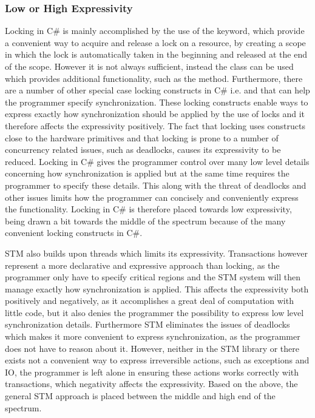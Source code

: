 \subsubsection{Low or High Expressivity}\label{subsec:expressivity}
Locking in C\# is mainly accomplished by the use of the  keyword, which provide a convenient way to acquire and release a lock on a resource, by creating a scope in which the lock is automatically taken in the beginning and released at the end of the scope. However it is not always sufficient, instead the  class can be used which provides additional functionality, such as the  method. Furthermore, there are a number of other special case locking constructs in C\#\cite{microsoftSyncPrim} i.e.    and  that can help the programmer specify synchronization. These locking constructs enable ways to express exactly how synchronization should be applied by the use of locks and it therefore affects the expressivity positively. The fact that locking uses constructs close to the hardware primitives and that  locking is prone to a number of concurrency related issues, such as deadlocks, causes its expressivity to be reduced. Locking in C\# gives the programmer control over many low level details concerning how synchronization is applied but at the same time requires the programmer to specify these details. This along with the threat of deadlocks and other issues limits how the programmer can concisely and conveniently express the functionality. Locking in C\# is therefore placed towards low expressivity, being drawn a bit towards the middle of the spectrum because of the many convenient locking constructs in C\#.

\ac{STM} also builds upon threads which limits its expressivity. Transactions however represent a more declarative and expressive approach than locking, as the programmer only have to specify critical regions and the \ac{STM} system will then manage exactly how synchronization is applied. This affects the expressivity both positively and negatively, as it accomplishes a great deal of computation with little code, but it also denies the programmer the possibility to express low level synchronization details. Furthermore \ac{STM} eliminates the issues of deadlocks which makes it more convenient to express synchronization, as the programmer does not have to reason about it. However, neither in the \ac{STM} library or \stmname there exists not a convenient way to express irreversible actions, such as exceptions and \ac{IO}, the programmer is left alone in ensuring these actions works correctly with transactions, which negativity affects the expressivity. Based on the above, the general \ac{STM} approach is placed between the middle and high end of the spectrum.

